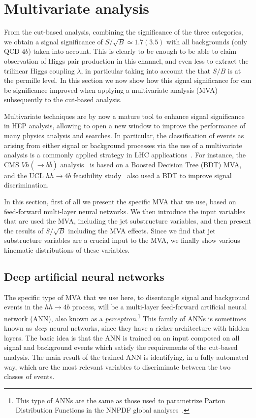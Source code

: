 
\section{Multivariate analysis}
\label{sec:mva}

From the cut-based analysis,
combining the significance of the three categories,
we obtain a signal significance of $S/\sqrt{B}\simeq 1.7 (3.5)$
with all backgrounds (only QCD $4b$) taken into account.
%
This is clearly
to be enough to be able to claim observation
of Higgs pair production
in this channel, and even less to extract the trilinear Higgs  coupling
$\lambda$, in particular
taking into account the that $S/B$ is at the permille level.
%
In this section we now show how this signal significance for
 can
be significance improved when
applying a multivariate analysis (MVA) subsequently
to the cut-based analysis.

 
%
Multivariate techniques are by now a mature tool to enhance signal
significance in HEP analysis, allowing
to open a new window to improve the performance
of many physics analysis and searches.
%
In particular, the classification of events as arising from either signal or
background processes via the use of a multivariate analysis is a
commonly applied strategy in LHC
applications~\cite{Baldi:2014pta,Aaltonen:2012qt,
  Wardrope:2014kya,Chatrchyan:2013zna,Dall'Osso:2015aia}.
%
For instance, the CMS $Vh(\to b\bar{b})$ analysis~\cite{Chatrchyan:2013zna}
is based on a Boosted Decision Tree (BDT) MVA, and the UCL $hh\to 4b$
feasibility study~\cite{Wardrope:2014kya}
also used  a BDT to improve signal discrimination.

In this section, first of all we present the specific MVA that we use,
based on feed-forward multi-layer neural networks.
%
We then introduce the input variables that are
used the MVA, including the jet substructure
variables, and then present the results of $S/\sqrt{B}$ including
the MVA effects.
%
Since we find that jet substructure variables are a crucial input
to the MVA, we finally show various kinematic distributions
of these variables.

\subsection{Deep artificial neural networks}

%
The specific type of  MVA that we use here, to
disentangle signal and background events in the $hh\to 4b$ process, will be
a multi-layer feed-forward artificial neural network (ANN),
also known as a {\it perceptron}.\footnote{This type of ANNs are the same
  as those used to parametrize Parton Distribution Functions
in the NNPDF global analyses~\cite{DelDebbio:2004qj,Ball:2008by,Ball:2011mu,Ball:2010de}.}
%
This family of ANNs is sometimes known as {\it deep} neural networks, since they have
a richer architecture with hidden layers.
%
The basic idea is that the ANN is trained on an input composed on
all  signal and background
events which satisfy the requirements of the
cut-based analysis.
%
The main result of the trained ANN is identifying, in a fully automated way,
which are the most relevant variables to discriminate between the two classes
of events.

